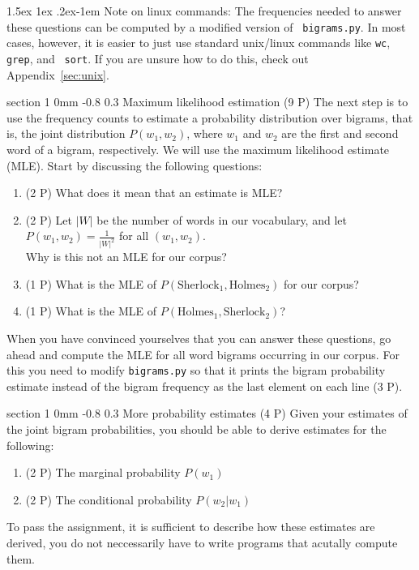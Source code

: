 \documentclass[11pt]{article}
\makeatletter
\newcommand{\newsec}[2]{\section{#1}\label{sec:#2}\noindent}
\renewcommand{\section}{\@startsection
{section}%
{1}%
{0mm}%
{-0.8\baselineskip}%
{0.3\baselineskip}%
{\bfseries\large}}%
\renewcommand{\paragraph}{%
  \@startsection{paragraph}{4}%
  {\z@}{1.5ex \@plus 1ex \@minus .2ex}{-1em}%
  {\normalfont\normalsize\bfseries}%
}\makeatother
\makeatother
\begin{document}
\paragraph{Note on linux commands:} The frequencies needed to answer
these questions can be computed by a modified version of {\tt
  bigrams.py}. In most cases, however, it is easier to just use
standard unix/linux commands like {\tt wc}, {\tt grep}, and {\tt
  sort}.  If you are unsure how to do this, check out
Appendix~\ref{sec:unix}.

\newsec{Maximum likelihood estimation (9 P)}{mle}%
The next step is to use the frequency counts to estimate a probability
distribution over bigrams, that is, the joint distribution $P(w_1,
w_2)$, where $w_1$ and $w_2$ are the first and second word of a
bigram, respectively.  We will use the maximum likelihood estimate
(MLE). Start by discussing the following questions:
\begin{enumerate}[itemsep=0pt]
\item (2 P) What does it mean that an estimate is MLE? %
\item (2 P) Let $|W|$ be the number of words in our vocabulary, and let $P(w_1, w_2) = \frac{1}{|W|^2}$ for all $(w_1, w_2)$.\\
  Why is this not an MLE for our
  corpus? %
\item (1 P) What is the MLE of $P(\mbox{Sherlock}_1, \mbox{Holmes}_2)$ for
  our corpus? %
\item (1 P) What is the MLE of $P(\mbox{Holmes}_1, \mbox{Sherlock}_2)$? %
\end{enumerate}
When you have convinced yourselves that you can answer these
questions, go ahead and compute the MLE for all word bigrams occurring
in our corpus. For this you need to modify {\tt bigrams.py} so that it
prints the bigram probability estimate instead of the bigram frequency
as the last element on each line (3 P).

\newsec{More probability estimates (4 P)}{refine}%
Given your estimates of the joint bigram probabilities, you should be
able to derive estimates for the following:
\begin{enumerate}[itemsep=0pt]
\item (2 P) The marginal probability $P(w_1)$
\item (2 P) The conditional probability $P(w_2 | w_1)$
\end{enumerate}
To pass the assignment, it is sufficient to describe how these
estimates are derived, you do not neccessarily have to write programs
that acutally compute them.
\end{document}

